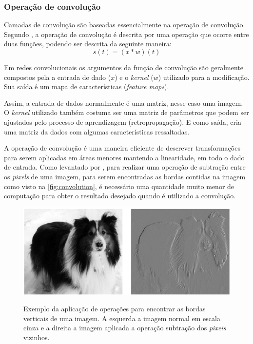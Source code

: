 \subsubsection{Operação de convolução}
Camadas de convolução são baseadas essencialmente na operação de convolução. Segundo \cite{Goodfellow-et-al-2016}, a operação de convolução é descrita por uma operação que ocorre entre duas funções, podendo ser descrita da seguinte maneira:\[s(t) = (x*w)(t)\] %


Em redes convolucionais os argumentos da função de convolução são geralmente compostos pela a entrada de dado ($x$) e o \textit{kernel} ($w$) utilizado para a modificação. Sua saída é um mapa de características (\textit{feature maps}).

\par Assim, a entrada de dados normalmente é uma matriz, nesse caso uma imagem. O \textit{kernel} utilizado também costuma ser uma matriz de parâmetros que podem ser ajustados pelo processo de aprendizagem (retropropagação). E como saída, cria uma matriz da dados com algumas características ressaltadas.

\par A operação de convolução é uma maneira eficiente de descrever transformações para serem aplicadas em áreas menores mantendo a linearidade, em todo o dado de entrada. Como levantado por , para realizar uma operação de subtração entre os \textit{pixels} de uma imagem, para serem encontradas as bordas contidas na imagem como visto na \autoref{fig:convolution}, é necessário uma quantidade muito menor de computação para obter o resultado desejado quando é utilizado a convolução.

\begin{figure}[H]
  \centering
  \caption{Exemplo da aplicação de operações para encontrar as bordas verticais de uma imagem. A esquerda a imagem normal em escala cinza e a direita a imagem aplicada a operação subtração dos \textit{pixeis} vizinhos.}
  \includegraphics[width=400pt]{dados/figuras/convolution}
  \label{fig:convolution}
\end{figure}


